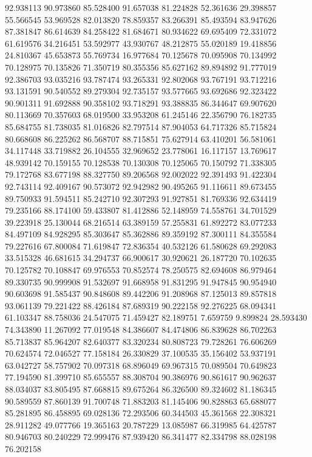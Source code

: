 92.938113
90.973860
85.528400
91.657038
81.224828
52.361636
29.398857
55.566545
53.969528
82.013820
78.859357
83.266391
85.493594
83.947626
87.381847
86.614639
84.258422
81.684671
80.934622
69.695409
72.331072
61.619576
34.216451
53.592977
43.930767
48.212875
55.020189
19.418856
24.810367
45.653873
55.769734
16.977684
70.125678
70.095908
70.134992
70.128975
70.135826
71.350719
80.355356
85.627162
89.894892
91.777019
92.386703
93.035216
93.787474
93.265331
92.802068
93.767191
93.712216
93.131591
90.540552
89.279304
92.735157
93.577665
93.692686
92.323422
90.901311
91.692888
90.358102
93.718291
93.388835
86.344647
69.907620
80.113669
70.357603
68.019500
33.953208
61.245146
22.356790
76.182735
85.684755
81.738035
81.016826
82.797514
87.904053
64.717326
85.715824
80.668608
86.225262
86.568707
88.715851
75.627914
63.410201
56.581061
34.117448
33.719882
26.104555
32.969652
23.778061
16.117157
13.769617
48.939142
70.159155
70.128538
70.130308
70.125065
70.150792
71.338305
79.172768
83.677198
88.327750
89.206568
92.002022
92.391493
91.422304
92.743114
92.409167
90.573072
92.942982
90.495265
91.116611
89.673455
89.750933
91.594511
85.242710
92.307293
91.927851
81.769336
92.634419
79.235166
88.174100
59.433807
81.412886
52.148959
74.558761
34.701529
39.223918
25.130044
68.216514
63.389159
57.255831
61.892272
83.077233
84.497109
84.928295
85.303647
85.362886
89.359192
87.300111
84.355584
79.227616
67.800084
71.619847
72.836354
40.532126
61.580628
69.292083
33.515328
46.681615
34.294737
66.900617
30.920621
26.187720
70.102635
70.125782
70.108847
69.976553
70.852574
78.250575
82.694608
86.979464
89.330735
90.999908
91.532697
91.668958
91.831295
91.947845
90.954940
90.603698
91.585437
90.848608
89.442206
91.208968
87.125013
89.857818
93.061139
79.221422
88.426184
87.689319
90.222158
92.276225
68.094341
61.103347
88.758036
24.547075
71.459427
82.189751
7.659759
9.899824
28.593430
74.343890
11.267092
77.019548
84.386607
84.474806
86.839628
86.702263
85.713837
85.964207
82.640377
83.320234
80.808723
79.728261
76.606269
70.624574
72.046527
77.158184
26.330829
37.100535
35.156402
53.937191
63.042727
58.757902
70.097318
68.896049
69.967315
70.089504
70.649823
77.194590
81.399710
85.655557
88.308704
90.386976
90.861617
90.962637
88.034037
83.805495
87.668815
89.675264
86.326500
89.324602
81.186345
90.589559
87.860139
91.700748
71.883203
81.145406
90.828863
65.688077
85.281895
86.458895
69.028136
72.293506
60.344503
45.361568
22.308321
28.911282
49.077766
19.365163
20.787229
13.085987
66.319985
64.425787
80.946703
80.240229
72.999476
87.939420
86.341477
82.334798
88.028198
76.202158

